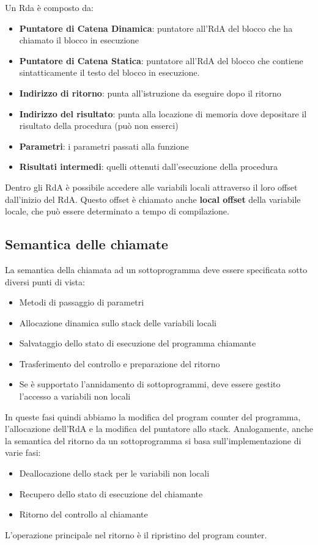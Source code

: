 \documentclass[12pt,a4paper]{article}
\begin{document}
Un Rda è composto da:
\begin{itemize}
\item \textbf{Puntatore di Catena Dinamica}: puntatore all'RdA del blocco che ha chiamato il blocco in esecuzione
\item \textbf{Puntatore di Catena Statica}: puntatore all'RdA del blocco che contiene sintatticamente il testo del blocco in esecuzione.
\item \textbf{Indirizzo di ritorno}: punta all'istruzione da eseguire dopo il ritorno
\item \textbf{Indirizzo del risultato}: punta alla locazione di memoria dove depositare il risultato della procedura (può non esserci)
\item \textbf{Parametri}: i parametri passati alla funzione
\item \textbf{Risultati intermedi}: quelli ottenuti dall'esecuzione della procedura
\end{itemize}
Dentro gli RdA è possibile accedere alle variabili locali attraverso il loro offset dall'inizio del RdA. Questo offset è chiamato anche \textbf{local offset} della variabile locale, che può essere determinato a tempo di compilazione.

\subsection{Semantica delle chiamate}
La semantica della chiamata ad un sottoprogramma deve essere specificata sotto diversi punti di vista:
\begin{itemize}
\item Metodi di passaggio di parametri
\item Allocazione dinamica sullo stack delle variabili locali
\item Salvataggio dello stato di esecuzione del programma chiamante
\item Trasferimento del controllo e preparazione del ritorno
\item Se è supportato l'annidamento di sottoprogrammi, deve essere gestito l'accesso a variabili non locali
\end{itemize}
In queste fasi quindi abbiamo la modifica del program counter del programma, l'allocazione dell'RdA e la modifica del puntatore allo stack. Analogamente, anche la semantica del ritorno da un sottoprogramma si basa sull'implementazione di varie fasi:
\begin{itemize}
\item Deallocazione dello stack per le variabili non locali
\item Recupero dello stato di esecuzione del chiamante
\item Ritorno del controllo al chiamante
\end{itemize}
L'operazione principale nel ritorno è il ripristino del program counter.
\end{document}
